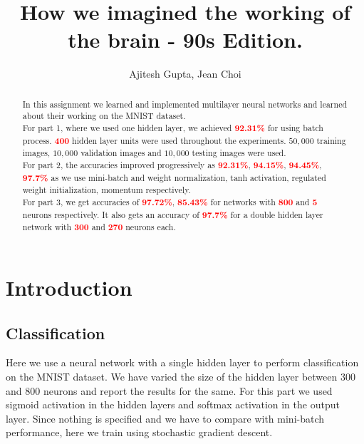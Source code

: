 \documentclass[11pt,twoside]{article}
\author{Ajitesh Gupta, Jean Choi} %
\title{How we imagined the working of the brain - 90s Edition.} %
\begin{document}
\maketitle

\begin{abstract}
In this assignment we learned and implemented multilayer neural networks and learned about their working on the MNIST dataset.\\ 

For part 1, where we used one hidden layer, we achieved \textcolor{red}{\textbf{92.31\%}} for using batch process. \textcolor{red}{\textbf{400}} hidden layer units were used throughout the experiments. $50,000$ training images, $10,000$ validation images and $10,000$ testing images were used.\\

For part 2, the accuracies improved progressively as \textcolor{red}{\textbf{92.31\%}}, \textcolor{red}{\textbf{94.15\%}}, \textcolor{red}{\textbf{94.45\%}}, \textcolor{red}{\textbf{97.7\%}} as we use mini-batch and weight normalization, tanh activation, regulated weight initialization, momentum respectively. \\

For part 3, we get accuracies of \textcolor{red}{\textbf{97.72\%}}, \textcolor{red}{\textbf{85.43\%}} for networks with \textcolor{red}{\textbf{800}} and \textcolor{red}{\textbf{5}} neurons respectively. It also gets an accuracy of \textcolor{red}{\textbf{97.7\%}} for a double hidden layer network with \textcolor{red}{\textbf{300}} and \textcolor{red}{\textbf{270}} neurons each.\\

\end{abstract}

\section{Introduction}


\subsection{Classification}

Here we use a neural network with a single hidden layer to perform classification on the MNIST dataset. We have varied the size of the hidden layer between 300 and 800 neurons and report the results for the same. For this part we used sigmoid activation in the hidden layers and softmax activation in the output layer. Since nothing is specified and we have to compare with mini-batch performance, here we train using stochastic gradient descent.
\end{document}
